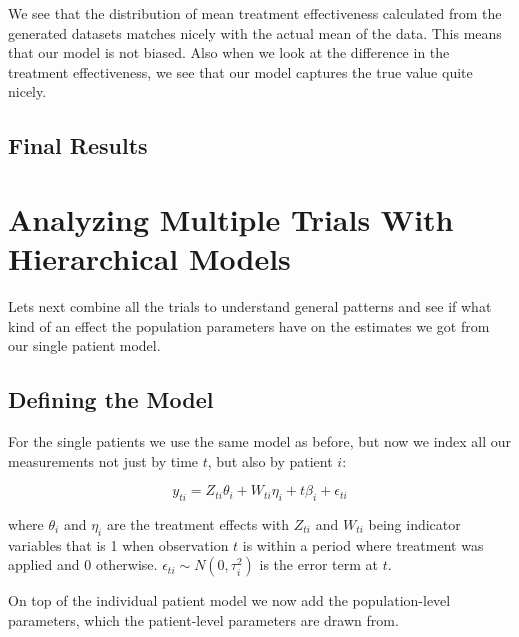 \documentclass[12pt,a4paper,leqno]{report}
\theoremstyle{plain}
\theoremstyle{definition}
\theoremstyle{remark}
\begin{document}
We see that the distribution of mean treatment effectiveness calculated from the
generated datasets matches nicely with the actual mean of the data. This means that our
model is not biased. Also when we look at the difference in the treatment effectiveness,
we see that our model captures the true value quite nicely.


\subsection{Final Results}


\section{Analyzing Multiple Trials With Hierarchical Models}\label{pooling}

Lets next combine all the trials to understand general patterns and see if what kind of
an effect the population parameters have on the estimates we got from our single patient
model.

\subsection{Defining the Model}\label{hiermodel}

For the single patients we use the same model as before, but now we index all our
measurements not just by time \(t\), but also by patient \(i\):

\begin{def}\label{simplesinglepatientmodel}
    \begin{equation}\label{}
        y_{ti} = Z_{ti}\theta_{i} + W_{ti}\eta_{i} + t\beta_{i} + \epsilon_{ti}
    \end{equation}
\end{def} where \(\theta_{i} \) and \(\eta_{i} \) are the treatment effects with \(Z_{ti}\) and \(W_{ti}\) being indicator
variables that is 1 when observation \(t\) is within a period where treatment was applied and
0 otherwise. \(\epsilon_{ti} \sim N(0,\tau_{i}^2) \) is the error term at \(t\).

On top of the individual patient model we now add the population-level parameters, which the
patient-level parameters are drawn from.
\end{document}
